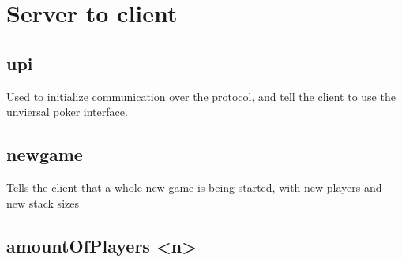 \documentclass{article}
\begin{document}
\section{Server to client}

\subsection{upi}
Used to initialize communication over the protocol, and tell the client to use the unviersal poker interface.

\subsection{newgame}
Tells the client that a whole new game is being started, with new players and new stack sizes

\subsection{amountOfPlayers <n>}
\end{document}
